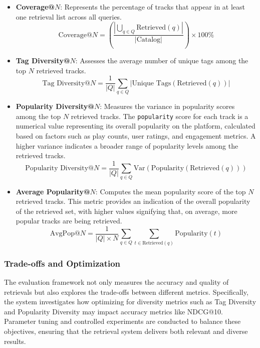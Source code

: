 \documentclass[sigconf]{acmart}
\begin{document}
\begin{itemize}
    \item \textbf{Coverage@\( N \)}: Represents the percentage of tracks that appear in at least one retrieval list across all queries.
    \[
    \text{Coverage@}N = \left( \frac{|\bigcup_{q \in Q} \text{Retrieved}(q)|}{|\text{Catalog}|} \right) \times 100\%
    \]
    
    \item \textbf{Tag Diversity@\( N \)}: Assesses the average number of unique tags among the top \( N \) retrieved tracks.
    \[
    \text{Tag Diversity@}N = \frac{1}{|Q|} \sum_{q \in Q} |\text{Unique Tags}(\text{Retrieved}(q))|
    \]

    
    \item \textbf{Popularity Diversity@\( N \)}: Measures the variance in popularity scores among the top \( N \) retrieved tracks. The \texttt{popularity} score for each track is a numerical value representing its overall popularity on the platform, calculated based on factors such as play counts, user ratings, and engagement metrics. A higher variance indicates a broader range of popularity levels among the retrieved tracks.
    \[
    \text{Popularity Diversity@}N = \frac{1}{|Q|} \sum_{q \in Q} \text{Var}(\text{Popularity}(\text{Retrieved}(q)))
    \]
    
    \item \textbf{Average Popularity@\( N \)}: Computes the mean popularity score of the top \( N \) retrieved tracks. This metric provides an indication of the overall popularity of the retrieved set, with higher values signifying that, on average, more popular tracks are being retrieved.
    \[
    \text{AvgPop@}N = \frac{1}{|Q| \times N} \sum_{q \in Q} \sum_{t \in \text{Retrieved}(q)} \text{Popularity}(t)
    \]
\end{itemize}

\subsubsection{Trade-offs and Optimization}

The evaluation framework not only measures the accuracy and quality of retrievals but also explores the trade-offs between different metrics. Specifically, the system investigates how optimizing for diversity metrics such as Tag Diversity and Popularity Diversity may impact accuracy metrics like NDCG@10. Parameter tuning and controlled experiments are conducted to balance these objectives, ensuring that the retrieval system delivers both relevant and diverse results.
\end{document}

